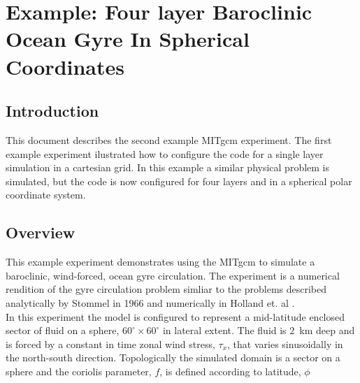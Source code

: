 
\section{Example: Four layer Baroclinic Ocean Gyre In Spherical Coordinates}


%
%

\subsection{Introduction}

This document describes the second example MITgcm experiment. The first
example experiment ilustrated how to configure the code for a single layer 
simulation in a cartesian grid. In this example a similar physical problem
is simulated, but the code is now configured
for four layers and in a spherical polar coordinate system.

\subsection{Overview}

This example experiment demonstrates using the MITgcm to simulate
a baroclinic, wind-forced, ocean gyre circulation. The experiment 
is a numerical rendition of the gyre circulation problem simliar
to the problems described analytically by Stommel in 1966 
\cite{Stommel66} and numerically in Holland et. al \cite{Holland75}.
\\

In this experiment the model is configured to represent a mid-latitude 
enclosed sector of fluid on a sphere, $60^{\circ} \times 60^{\circ}$ in 
lateral extent. The fluid is $2$~km deep and is forced
by a constant in time zonal wind stress, $\tau_x$, that varies sinusoidally
in the north-south direction. Topologically the simulated 
domain is a sector on a sphere and the coriolis parameter, $f$, is defined 
according to latitude, $\phi$

